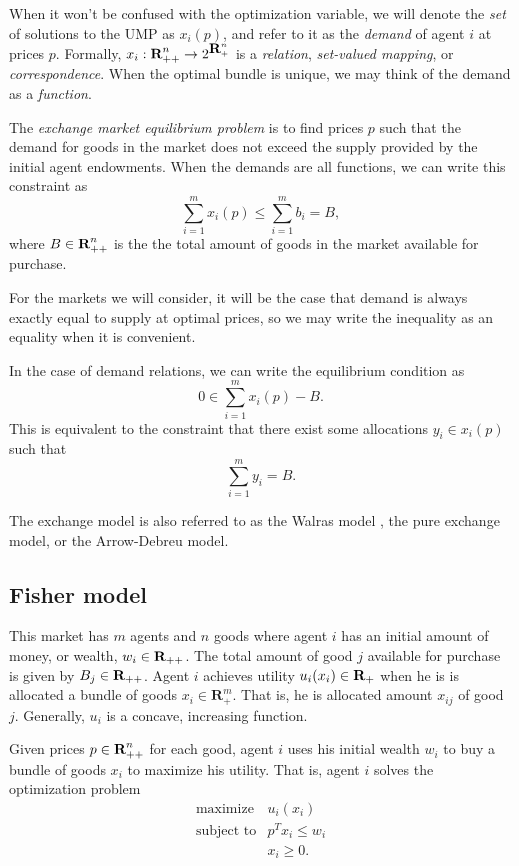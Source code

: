 \documentclass[12pt]{article}
\begin{document}
When it won't be confused with the optimization variable,
we will denote the \emph{set} of solutions to the UMP as $x_i(p)$,
and refer to it as the \emph{demand} of agent $i$ at prices $p$.
Formally, $x_i : {\mbox{\bf R}}^n_{++} \to 2^{{\mbox{\bf R}}^n_+}$ is a
\emph{relation}, \emph{set-valued mapping}, or \emph{correspondence}.
When the optimal bundle is unique, we may think of
the demand as a \emph{function}.

The \emph{exchange market equilibrium problem} is to find prices $p$
such that the demand for goods in the market does not exceed the supply
provided by the initial agent endowments.
When the demands are all functions, we can write this constraint as
\[
\sum_{i=1}^m x_{i}(p) \leq \sum_{i=1}^m b_i = B,
\]
where $B \in {\mbox{\bf R}}^n_{++}$ is the
the total amount of goods in the market available for purchase.

For the markets we will consider, it will be the case that demand is
always exactly equal to supply at optimal prices,
so we may write the inequality as an equality when it is convenient. 

In the case of demand relations, we can write the equilibrium
condition as
\[
0 \in \sum_{i=1}^m x_{i}(p) - B.
\]
This is equivalent to the constraint that there exist some
allocations $y_i \in x_i(p)$ such that
\[
\sum_{i=1}^m y_i = B.
\]

The exchange model is also referred to as the Walras model \cite{walras1896elements},
the pure exchange model, or the Arrow-Debreu model. %

\subsection{Fisher model}
This market has $m$ agents and $n$ goods where
agent $i$ has an initial amount of money, or wealth, $w_i \in {\mbox{\bf R}}_{++}$.
The total amount of good $j$ available for purchase is given by
$B_j \in {\mbox{\bf R}}_{++}$.
Agent $i$ achieves utility $u_i(x_i) \in {\mbox{\bf R}}_+$ when he is is allocated a
bundle of goods $x_i \in \mathbf{R}^m_{+}$. That is, he is allocated amount
$x_{ij}$ of good $j$.
Generally, $u_i$ is a concave, increasing function.

Given prices $p \in {\mbox{\bf R}}^n_{++}$ for each good, agent $i$ uses his initial
wealth $w_i$ to buy a bundle of goods $x_i$ to maximize his utility.
That is, agent $i$ solves the optimization problem
\[
\begin{array}{ll}
\mbox{maximize} & u_i(x_i) \\
\mbox{subject to} & p^T x_i \leq w_i \\
& x_i \geq 0.
\end{array}
\]
\end{document}
